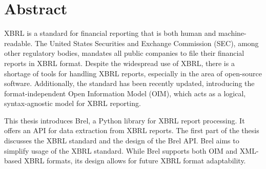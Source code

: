 \section{Abstract}




XBRL is a standard for financial reporting that is both human and machine-readable.
The United States Securities and Exchange Commission (SEC), among other regulatory bodies,  
mandates all public companies to file their financial reports in XBRL format.
Despite the widespread use of XBRL, there is a shortage of tools for handling XBRL reports,
especially in the area of open-source software.
Additionally, the standard has been recently updated,  
introducing the format-independent Open Information Model (OIM), 
which acts as a logical, syntax-agnostic model for XBRL reporting.

This thesis introduces Brel, a Python library for XBRL report processing.  
It offers an API for data extraction from XBRL reports.
The first part of the thesis discusses the XBRL standard and the design of the Brel API.
Brel aims to simplify usage of the XBRL standard.
While Brel supports both OIM and XML-based XBRL formats,  
its design allows for future XBRL format adaptability.

